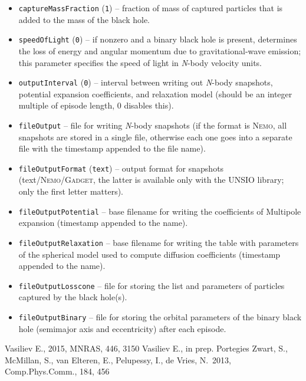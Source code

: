 \documentclass[12pt]{article}
\newcommand{\Nbody}{\textsl{N}-body\xspace}
\newcommand{\Nemo}{\textsc{Nemo}\xspace}
\begin{document}
\begin{itemize}
\item \texttt{captureMassFraction}  (\texttt{1}) -- fraction of mass of captured particles that is added to the mass of the black hole.
\item \texttt{speedOfLight}  (\texttt{0}) -- if nonzero and a binary black hole is present, determines the loss of energy and angular momentum due to gravitational-wave emission; this parameter specifies the speed of light in \Nbody velocity units.
\item \texttt{outputInterval}  (\texttt{0}) -- interval between writing out \Nbody snapshots, potential expansion coefficients, and relaxation model (should be an integer multiple of episode length, 0 disables this).
\item \texttt{fileOutput}  -- file for writing \Nbody snapshots (if the format is \Nemo, all snapshots are stored in a single file, otherwise each one goes into a separate file with the timestamp appended to the file name).
\item \texttt{fileOutputFormat}  (\texttt{text}) -- output format for snapshots (text/\Nemo/\textsc{Gadget}, the latter is available only with the UNSIO library; only the first letter matters).
\item \texttt{fileOutputPotential}  -- base filename for writing the coefficients of Multipole expansion (timestamp appended to the name).
\item \texttt{fileOutputRelaxation}  -- base filename for writing the table with parameters of the spherical model used to compute diffusion coefficients (timestamp appended to the name).
\item \texttt{fileOutputLosscone}  -- file for storing the list and parameters of particles captured by the black hole(s).
\item \texttt{fileOutputBinary}  -- file for storing the orbital parameters of the binary black hole (semimajor axis and eccentricity) after each episode.
\end{itemize}

\begin{thebibliography}{1}
 Vasiliev E., 2015, MNRAS, 446, 3150
 Vasiliev E., in prep.
 Portegies Zwart, S., McMillan, S., van Elteren, E., Pelupessy, I., de Vries, N.\ 2013, Comp.Phys.Comm., 184, 456
\end{thebibliography}
\end{document}
